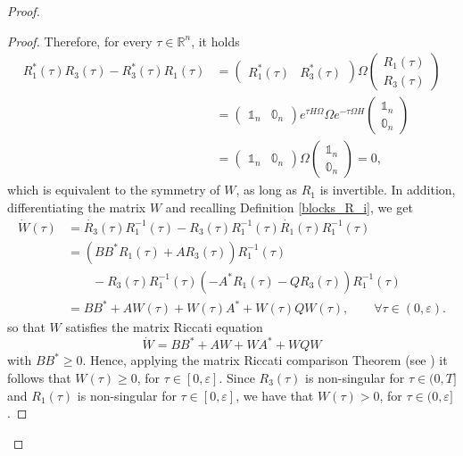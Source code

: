 \documentclass[reqno]{amsart}
\theoremstyle{plain}
\theoremstyle{definition}
\theoremstyle{remark}
\begin{document}
\begin{proof}
\begin{proof}
			Therefore, for every $\tau\in\mathbb{R}^n$, it holds
			\begin{align}
				R_1^*(\tau)R_3(\tau)-R_3^*(\tau)R_1(\tau)&=\begin{pmatrix}
					R_1^*(\tau) & R_3^*(\tau)
				\end{pmatrix}\Omega\begin{pmatrix}
				R_1(\tau)\\ 
				R_3(\tau)
				\end{pmatrix}\\
				&=\begin{pmatrix}
					\mathbb{1}_n & \mathbb{0}_n
				\end{pmatrix}e^{\tau H\Omega}\Omega e^{-\tau\Omega H}\begin{pmatrix}
					\mathbb{1}_n\\ 
					\mathbb{0}_n
				\end{pmatrix}\\
				&=\begin{pmatrix}
					\mathbb{1}_n & \mathbb{0}_n
				\end{pmatrix}\Omega\begin{pmatrix}
					\mathbb{1}_n\\ 
					\mathbb{0}_n
				\end{pmatrix}=0,
			\end{align}
			which is equivalent to the symmetry of $W$, as long as $R_1$ is invertible.
			In addition, differentiating the matrix $W$ and recalling Definition \ref{blocks_R_i}, we get
			\begin{align}
				\dot{W}(\tau)&=\dot{R_3}(\tau)R_1^{-1}(\tau)-R_3(\tau)R_1^{-1}(\tau)\dot{R_1}(\tau)R_1^{-1}(\tau)\\
				&=\left(BB^*R_1(\tau)+AR_3(\tau)\right)R_1^{-1}(\tau)\\
				&\qquad-R_3(\tau)R_1^{-1}(\tau)\left(-A^*R_1(\tau)-QR_3(\tau)\right)R_1^{-1}(\tau)\\
				&=BB^*+AW(\tau)+W(\tau)A^*+W(\tau)QW(\tau),\qquad\forall \tau\in(0,\varepsilon).
			\end{align}
			so that $W$ satisfies the matrix Riccati equation
			\begin{equation}
				\dot{W}=BB^*+AW+WA^*+WQW
			\end{equation}
			with $BB^*\geq 0$.
			Hence, applying the matrix Riccati comparison Theorem (see \cite[Appendix A]{Barilari_2016}) it follows that $W(\tau)\geq 0$, for $\tau\in[0,\varepsilon]$. Since $R_3(\tau)$ is non-singular for $\tau\in(0,T]$ and $R_1(\tau)$ is non-singular for $\tau\in[0,\varepsilon]$, we have that $W(\tau)>0$, for $\tau\in(0,\varepsilon]$.

\end{proof}
\end{proof}
\end{document}

